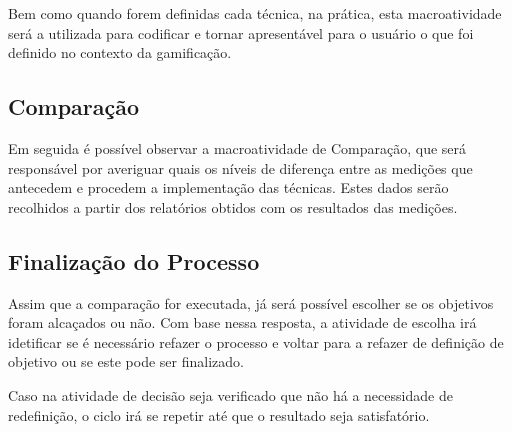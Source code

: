 Bem como quando forem definidas cada técnica, na prática, esta macroatividade
será a utilizada para codificar e tornar apresentável para o usuário o que
foi definido no contexto da gamificação.

\subsection{Comparação}
\label{sub:Comparacao}
Em seguida é possível observar a macroatividade de Comparação, que será
responsável por averiguar quais os níveis de diferença entre as medições que
antecedem e procedem a implementação das técnicas. Estes dados serão recolhidos a
partir dos relatórios obtidos com os resultados das medições.

\subsection{Finalização do Processo}
\label{sub:finalprocess}
Assim que a comparação for executada, já será possível escolher se os objetivos
foram alcaçados ou não. Com base nessa resposta, a atividade de escolha irá
idetificar se é necessário refazer o processo e voltar para a refazer de definição
de objetivo ou se este pode ser finalizado.

Caso na atividade de decisão seja verificado que não há a necessidade de
redefinição, o ciclo irá se repetir até que o resultado seja satisfatório.

